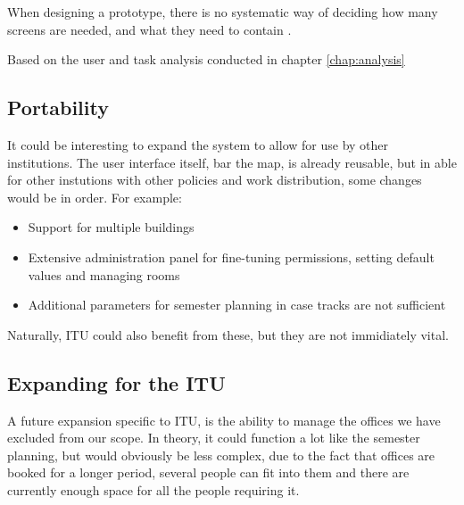 When designing a prototype, there is no systematic way of deciding how many screens are needed, and what they need to contain \cite{lauesen}.


Based on the user and task analysis conducted in chapter \ref{chap:analysis}



\subsection{Portability}
It could be interesting to expand the system to allow for use by other institutions. The user interface itself, bar the map, is already reusable, but in able for other instutions with other policies and work distribution, some changes would be in order.
For example:
\begin{itemize}
\item Support for multiple buildings
\item Extensive administration panel for fine-tuning permissions, setting default values and managing rooms
\item Additional parameters for semester planning in case tracks are not sufficient
\end{itemize}

Naturally, ITU could also benefit from these, but they are not immidiately vital.

\subsection{Expanding for the ITU}
A future expansion specific to ITU, is the ability to manage the offices we have excluded from our scope. In theory, it could function a lot like the semester planning, but would obviously be less complex, due to the fact that offices are booked for a longer period, several people can fit into them and there are currently enough space for all the people requiring it.

